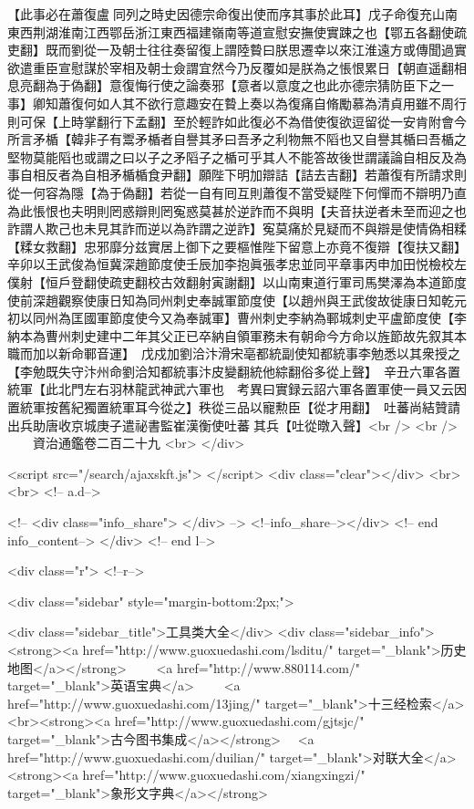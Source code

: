【此事必在蕭復盧同列之時史因德宗命復出使而序其事於此耳】戊子命復充山南東西荆湖淮南江西鄂岳浙江東西福建嶺南等道宣慰安撫使實踈之也【鄂五各翻使疏吏翻】既而劉從一及朝士往往奏留復上謂陸䞇曰朕思遷幸以來江淮遠方或傳聞過實欲遣重臣宣慰謀於宰相及朝士僉謂宜然今乃反覆如是朕為之悵恨累日【朝直遥翻相息亮翻為于偽翻】意復悔行使之論奏邪【意者以意度之也此亦德宗猜防臣下之一事】卿知蕭復何如人其不欲行意趣安在䞇上奏以為復痛自脩勵慕為清貞用雖不周行則可保【上時掌翻行下孟翻】至於輕詐如此復必不為借使復欲逗留從一安肯附會今所言矛楯【韓非子有鬻矛楯者自譽其矛曰吾矛之利物無不䧟也又自譽其楯曰吾楯之堅物莫能䧟也或謂之曰以子之矛䧟子之楯可乎其人不能答故後世謂議論自相反及為事自相反者為自相矛楯楯食尹翻】願陛下明加辯詰【詰去吉翻】若蕭復有所請求則從一何容為隱【為于偽翻】若從一自有囘互則蕭復不當受疑陛下何憚而不辯明乃直為此悵恨也夫明則罔惑辯則罔寃惑莫甚於逆詐而不與明【夫音扶逆者未至而迎之也詐謂人欺己也未見其詐而逆以為詐謂之逆詐】寃莫痛於見疑而不與辯是使情偽相糅【糅女救翻】忠邪靡分兹實居上御下之要樞惟陛下留意上亦竟不復辯【復扶又翻】　辛卯以王武俊為恒冀深趙節度使壬辰加李抱眞張孝忠並同平章事丙申加田悦檢校左僕射【恒戶登翻使疏吏翻校古效翻射寅謝翻】以山南東道行軍司馬樊澤為本道節度使前深趙觀察使康日知為同州刺史奉誠軍節度使【以趙州與王武俊故徙康日知乾元初以同州為匡國軍節度使今又為奉誠軍】曹州刺史李納為鄆城刺史平盧節度使【李納本為曹州刺史建中二年其父正已卒納自領軍務未有朝命今方命以旌節故先叙其本職而加以新命鄆音運】　戊戍加劉洽汴滑宋亳都統副使知都統事李勉悉以其衆授之【李勉既失守汴州命劉洽知都統事汴皮變翻統他綜翻俗多從上聲】　辛丑六軍各置統軍【此北門左右羽林龍武神武六軍也　考異曰實録云詔六軍各置軍使一員又云因置統軍按舊紀獨置統軍耳今從之】秩從三品以寵勲臣【從才用翻】　吐蕃尚結贊請出兵助唐收京城庚子遣祕書監崔漢衡使吐蕃其兵【吐從暾入聲】<br />
<br />
　　資治通鑑卷二百二十九  <br>
   </div> 

<script src="/search/ajaxskft.js"> </script>
 <div class="clear"></div>
<br>
<br>
 <!-- a.d-->

 <!--
<div class="info_share">
</div> 
-->
 <!--info_share--></div>   <!-- end info_content-->
  </div> <!-- end l-->

<div class="r">   <!--r-->



<div class="sidebar"  style="margin-bottom:2px;">

 
<div class="sidebar_title">工具类大全</div>
<div class="sidebar_info">
<strong><a href="http://www.guoxuedashi.com/lsditu/" target="_blank">历史地图</a></strong>　　
<a href="http://www.880114.com/" target="_blank">英语宝典</a>　　
<a href="http://www.guoxuedashi.com/13jing/" target="_blank">十三经检索</a>　
<br><strong><a href="http://www.guoxuedashi.com/gjtsjc/" target="_blank">古今图书集成</a></strong>　
<a href="http://www.guoxuedashi.com/duilian/" target="_blank">对联大全</a>　<strong><a href="http://www.guoxuedashi.com/xiangxingzi/" target="_blank">象形文字典</a></strong>　

